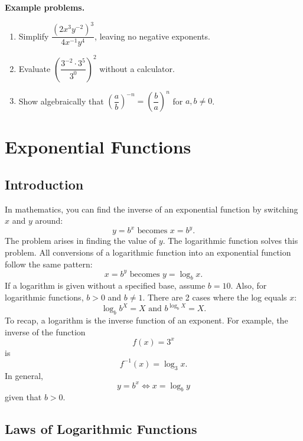 \textbf{Example problems.}

\begin{enumerate}
    \item Simplify $\dfrac{(2x^3 y^{-2})^3}{4x^{-1} y^4}$, leaving no negative exponents.
    \item Evaluate $\left(\dfrac{3^{-2} \cdot 3^5}{3^0}\right)^2$ without a calculator.
    \item Show algebraically that $\left(\dfrac{a}{b}\right)^{-n} = \left(\dfrac{b}{a}\right)^n$ for $a, b \neq 0$.
\end{enumerate}

\section{Exponential Functions}
\label{sec:expo-6c26}

\subsection{Introduction}
\label{sss:intr-8800}

In mathematics, you can find the inverse of an exponential function by switching $x$ and $y$ around: 
\[
y = b^x \text{ becomes } x = b^y.
\]
The problem arises in finding the value of $y$. The logarithmic function solves this problem. All conversions of a logarithmic function into an exponential function follow the same pattern:
\[
x = b^y \text{ becomes } y = \log_b x.
\]
If a logarithm is given without a specified base, assume $b = 10$. Also, for logarithmic functions, $b > 0$ and $b \neq 1$. There are 2 cases where the log equals $x$:
\[
\log_b b^X = X \text{ and } b^{\log_b X} = X.
\]
To recap, a logarithm is the inverse function of an exponent. For example, the inverse of
the function
\[
f(x) = 3^x
\]
is
\[
f^{-1}(x) = \log_3 x.
\]
In general,
\[
y = b^x \iff x = \log_b y
\]
given that $b > 0$.

\subsection{Laws of Logarithmic Functions}
\label{sss:laws-71be}

